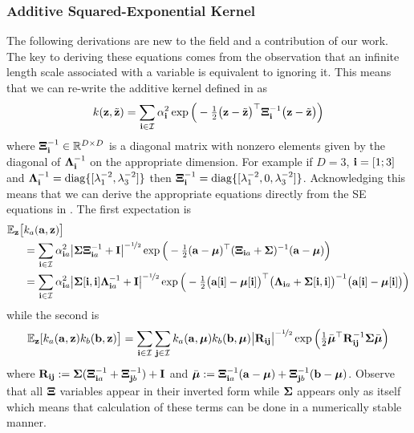 \subsubsection{Additive Squared-Exponential Kernel} 
The following derivations are new to the field and a contribution of our work. The key to deriving these equations comes from the observation that an infinite length scale associated with a variable is equivalent to ignoring it. This means that we can re-write the additive kernel defined in  as
\begin{equation}
k(\mathbf{z},\tilde{\mathbf{z}}) = \sum_{\mathbf{i} \in \mathcal{I}} \alpha_{\mathbf{i}}^2 
\exp\Big(-\tfrac{1}{2}
\big(\mathbf{z} - \tilde{\mathbf{z}}\big)^\top  \boldsymbol{\Xi}_{\mathbf{i}}^{-1}  
\big(\mathbf{z} - \tilde{\mathbf{z}}\big) \Big)
\end{equation}
where $\boldsymbol{\Xi}_{\mathbf{i}}^{-1} \in \mathbb{R}^{D\times D}$ is a diagonal matrix with nonzero elements given by the diagonal of $\boldsymbol{\Lambda}_{\mathbf{i}}^{-1}$ on the appropriate dimension. For example if $D=3$, $\mathbf{i} = [1;3]$ and $\boldsymbol{\Lambda}_{\mathbf{i}}^{-1} = \mathrm{diag}\{[\lambda_1^{-2}, \lambda_3^{-2}]\}$ then $\boldsymbol{\Xi}_{\mathbf{i}}^{-1} = \mathrm{diag}\{[\lambda_1^{-2}, 0, \lambda_3^{-2}]\}$. Acknowledging this means that we can derive the appropriate equations directly from the SE equations in . The first expectation is
%
\begin{align}
\nonumber \EE_{\bz}\big[ &k_a(\ba,\bz) \big] \\
\nonumber &=  \sum_{\bi \in \cI} \alpha_{\bi a}^2  \big|\bS\bXi_{\bi a}\inv + \bI\big|^{-\sha} \exp\Big( -\half(\ba-\bm)\T(\bXi_{\bi a}+\bS)\inv (\ba-\bm)\Big) \\
%
&=  \sum_{\bi \in \cI} \alpha_{\bi a}^2  \big|\bS[\bi,\bi]\bLa_{\bi a}\inv + \bI\big|^{-\sha}
\exp\Big( -\half\big(\ba[\bi]-\bm[\bi]\big)\T\big(\bLa_{\bi a}+\bS[\bi,\bi]\big)\inv \big(\ba[\bi]-\bm[\bi]\big)\Big) 
\label{eqn:aSEpropM}
\end{align}
while the second is 
\begin{equation}
\mathbb{E}_{\mathbf{z}}[k_a(\mathbf{a},\mathbf{z})k_b(\mathbf{b},\mathbf{z})\big] = \sum_{\mathbf{i} \in \mathcal{I}}\sum_{\mathbf{j} \in \mathcal{I}}k_a(\mathbf{a},\boldsymbol{\mu})k_b(\mathbf{b},\boldsymbol{\mu}) \big|\mathbf{R}_{\mathbf{i}\mathbf{j}}\big|^{-\nicefrac{1}{2}}
\exp\Big( \tfrac{1}{2}\bar{\boldsymbol{\mu}}^\top \mathbf{R}_{\mathbf{i}\mathbf{j}}^{-1}\boldsymbol{\Sigma} \bar{\boldsymbol{\mu}} \Big)
\label{eqn:aSEpropV}
\end{equation}
where $\mathbf{R}_{\mathbf{i}\mathbf{j}} := \boldsymbol{\Sigma}(\boldsymbol{\Xi}_{\mathbf{i} a}^{-1}+\boldsymbol{\Xi}_{\mathbf{j} b}^{-1}) + \mathbf{I}$ and $\bar{\boldsymbol{\mu}} := \boldsymbol{\Xi}_{\mathbf{i} a}^{-1}(\mathbf{a}-\boldsymbol{\mu}) + \boldsymbol{\Xi}_{\mathbf{j} b}^{-1}(\mathbf{b}-\boldsymbol{\mu})$. Observe that all $\boldsymbol{\Xi}$ variables appear in their inverted form while $\boldsymbol{\Sigma}$ appears only as itself which means that calculation of these terms can be done in a numerically stable manner. 




